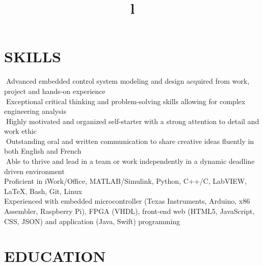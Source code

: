 \documentclass[mm]{res}
\begin{document}



\begin{resume}

\npspctoprule
\section{\faSliders \xspace SKILLS \xspace}
􏰚\tb Advanced embedded control system modeling and design acquired from work, project and hands-on experience \\
􏰚\tb Exceptional critical thinking and problem-solving skills allowing for complex engineering analysis \\
􏰚\tb Highly motivated and organized self-starter with a strong attention to detail and work ethic \\
􏰚\tb Outstanding oral and written communication to share creative ideas fluently in both English and French \\
􏰚\tb Able to thrive and lead in a team or work independently in a dynamic deadline driven environment \\
\tb Proficient in iWork/Office, MATLAB/Simulink, Python, C++/C, LabVIEW, \LaTeX \xspace , Bash, Git, Linux \\
\tb Experienced with embedded microcontroller (Texas Instruments, Arduino, x86 Assembler, Raspberry Pi), FPGA (VHDL), front-end web (HTML5, JavaScript, CSS, JSON) and application (Java, Swift) programming


\toprule
\section{\faGraduationCap \xspace EDUCATION \xspace}
\begin{format}
\\
\title{l}\\
\end{format}


\end{resume}
\end{document}
